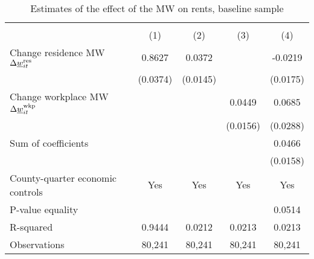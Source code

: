 \begin{table}[hbt!] \centering
    \caption{Estimates of the effect of the MW on rents, baseline sample}
    \label{tab:static}
    \begin{tabular}{l*{4}{c}}
        \toprule
        & 
            &  \\ \cmidrule(lr){2-2}\cmidrule(lr){3-5}
                                           & (1)   & (2)   & (3)   & (4)            \\ \midrule
        Change residence MW 
                  $\Delta\underline{w}_{it}^{\text{res}}$  &  0.8627  &  0.0372  &       &  -0.0219     \\
                                           & (0.0374) & (0.0145) &       & (0.0175)    \\
        Change workplace MW 
                   $\Delta\underline{w}_{it}^{\text{wkp}}$ &       &       &  0.0449  & 0.0685      \\
                                           &       &       & (0.0156) & (0.0288)    \\ \midrule
        Sum of coefficients                &       &       &       &  0.0466     \\
                                           &       &       &       & (0.0158)    \\ \midrule
        County-quarter economic controls   &  Yes  & Yes   & Yes   & Yes      \\
        P-value equality                   &       &       &       & 0.0514      \\
        R-squared                          &  0.9444  &  0.0212  &  0.0213  & 0.0213      \\
        Observations                       & 80,241  & 80,241  & 80,241  & 80,241     \\\bottomrule
    \end{tabular}


\end{table}

